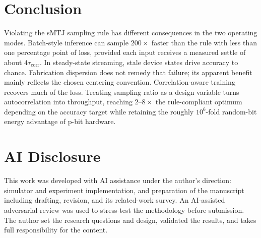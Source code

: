 \documentclass[journal]{IEEEtran}
\newcommand{\tauc}{\tau_{\mathrm{corr}}}
\begin{document}
\section{Conclusion}
Violating the sMTJ sampling rule has different consequences in the two
operating modes. Batch-style inference can sample $200\times$ faster than
the rule with less than one percentage point of loss, provided each input
receives a measured settle of about $4\tauc$. In steady-state streaming,
stale device states drive accuracy to chance. Fabrication dispersion does
not remedy that failure; its apparent benefit mainly reflects the chosen
centering convention. Correlation-aware training recovers much of the loss.
Treating sampling ratio as a design variable turns autocorrelation into
throughput, reaching $2$--$8\times$ the rule-compliant optimum depending on
the accuracy target while retaining the roughly $10^6$-fold random-bit
energy advantage of p-bit hardware.

\section*{AI Disclosure}
This work was developed with AI assistance under the author's
direction: simulator and experiment implementation, and preparation of
the manuscript including drafting, revision, and its related-work
survey. An AI-assisted adversarial review was used to stress-test the
methodology before submission. The author set the research questions and
design, validated the results, and takes full responsibility for the
content.



\end{document}
